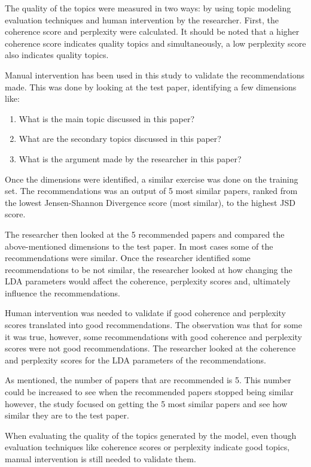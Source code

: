 The quality of the topics were measured in two ways: by using topic modeling evaluation techniques and human intervention by the researcher. First, the coherence score and perplexity were calculated. It should be noted that a higher coherence score indicates quality topics and simultaneously, a low perplexity score also indicates quality topics.

Manual intervention has been used in this study to validate the recommendations made. This was done by looking at the test paper, identifying a few dimensions like:

\begin{enumerate}
    \item What is the main topic discussed in this paper?
    \item What are the secondary topics discussed in this paper?
    \item What is the argument made by the researcher in this paper?
\end{enumerate}

Once the dimensions were identified, a similar exercise was done on the training set.
The recommendations was an output of 5 most similar papers, ranked from the lowest Jensen-Shannon Divergence score (most similar), to the highest JSD score.

The researcher then looked at the 5 recommended papers and compared the above-mentioned dimensions to the test paper. In most cases some of the recommendations were similar. Once the researcher identified some recommendations to be not similar, the researcher looked at how changing the LDA parameters would affect the coherence, perplexity scores and, ultimately influence the recommendations.

Human intervention was needed to validate if good coherence and perplexity scores translated into good recommendations. The observation was that for some it was true, however, some recommendations with good coherence and perplexity scores were not good recommendations. The researcher looked at the coherence and perplexity scores for the LDA parameters of the recommendations.

As mentioned, the number of papers that are recommended is 5. This number could be increased to see when the recommended papers stopped being similar however, the study focused on getting the 5 most similar papers and see how similar they are to the test paper.

\begin{lesson}
When evaluating the quality of the topics generated by the model, even though evaluation techniques like coherence scores or perplexity indicate good topics, manual intervention is still needed to validate them.
\end{lesson}\label{L:manual}


